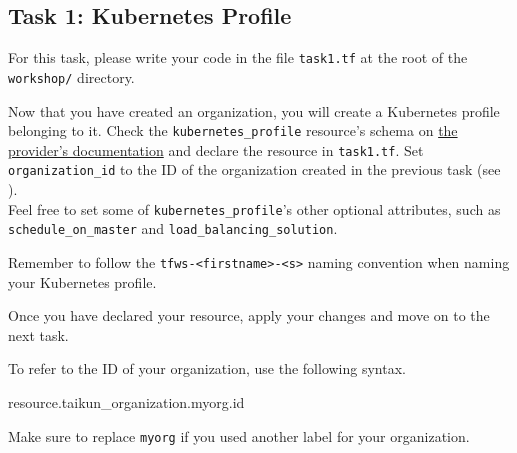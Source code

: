 \subsection{Task 1: Kubernetes Profile}\label{sec:task1}

\begin{note}
For this task, please write your code in the file \texttt{task1.tf}
at the root of the \texttt{workshop/} directory.
\end{note}

Now that you have created an organization,
you will create a Kubernetes profile belonging to it.
Check the \texttt{kubernetes\_profile} resource's schema on
\href{https://intuinewin.github.io/taikun-docs/resources/kubernetes_profile.html}{the provider's documentation}
and declare the resource in \texttt{task1.tf}.
Set \texttt{organization\_id} to the ID
of the organization created in the previous task (see ).\\

Feel free to set some of \texttt{kubernetes\_profile}'s other optional attributes,
such as \texttt{schedule\_on\_master} and \texttt{load\_balancing\_solution}.

\begin{warn}
  Remember to follow the \texttt{tfws-<firstname>-<s>} naming convention when naming your Kubernetes profile.
\end{warn}

Once you have declared your resource, apply your changes and move on to the next task.

\begin{tip}
To refer to the ID of your organization, use the following syntax.
\begin{tf}
resource.taikun_organization.myorg.id
\end{tf}
Make sure to replace \texttt{myorg} if you used another label for your organization.
\end{tip}

